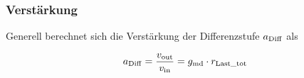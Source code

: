 








\subsubsection{Verstärkung}

Generell berechnet sich die Verstärkung der Differenzstufe $a_{\rm Diff}$ als 

\[
    a_{\rm Diff} = \frac{v_{\rm out}}{v_{\rm in}} = g_{\rm md} \cdot r_{\rm Last\_tot}
\]

